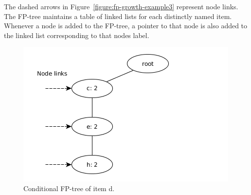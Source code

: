 The dashed arrows in Figure~\ref{figure:fp-growth-example3} represent node links. The FP-tree maintains a table of linked lists for each distinctly named item. Whenever a node is added to the FP-tree, a pointer to that node is also added to the linked list corresponding to that nodes label.

\begin{figure}[!htbp]
	\centering
	\includegraphics[scale=0.5]{fp-tree-example/fp-tree-conditional.png}
	\caption{Conditional FP-tree of item d.}
	\label{figure:fp-tree-conditional}
\end{figure}


